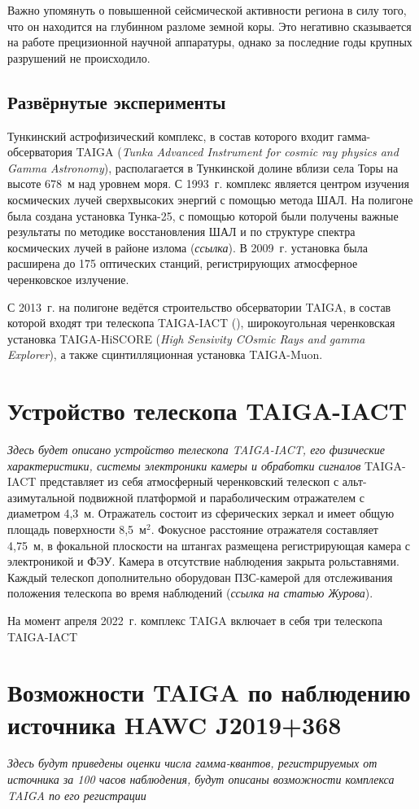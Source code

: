 \documentclass[magd,floatypics,numeref]{msudipl} %
\begin{document}
Важно упомянуть о повышенной сейсмической активности региона в силу того, что он находится на глубинном разломе земной коры. Это негативно сказывается на работе прецизионной научной аппаратуры, однако за последние годы крупных разрушений не происходило.
\subsection{Развёрнутые эксперименты}
Тункинский астрофизический комплекс, в состав которого входит гамма-обсерватория TAIGA (\textit{Tunka Advanced Instrument for cosmic ray physics and Gamma Astronomy}), располагается в Тункинской долине вблизи села Торы на высоте 678~м над уровнем моря. С 1993~г. комплекс является центром изучения космических лучей сверхвысоких энергий с помощью метода ШАЛ. На полигоне была создана установка Тунка-25, с помощью которой были получены важные результаты по методике восстановления ШАЛ и по структуре спектра космических лучей в районе излома (\textit{ссылка}). В 2009~г. установка была расширена до 175 оптических станций, регистрирующих атмосферное черенковское излучение. 

С 2013~г. на полигоне ведётся строительство обсерватории TAIGA, в состав которой входят три телескопа TAIGA-IACT (), широкоугольная черенковская установка TAIGA-HiSCORE (\textit{High Sensivity COsmic Rays and gamma Explorer}), а также сцинтилляционная установка TAIGA-Muon.
\section{Устройство телескопа TAIGA-IACT}
\textit{
Здесь будет описано устройство телескопа TAIGA-IACT, его физические характеристики, системы электроники камеры и обработки сигналов
}
TAIGA-IACT представляет из себя атмосферный черенковский телескоп с альт-азимутальной подвижной платформой и параболическим отражателем с диаметром 4,3~м. Отражатель состоит из сферических зеркал и имеет общую площадь поверхности 8,5~$\text{м}^\text{2}$. Фокусное расстояние отражателя составляет 4,75~м, в фокальной плоскости на штангах размещена регистрирующая камера с электроникой и ФЭУ. Камера в отсутствие наблюдения закрыта рольставнями. Каждый телескоп дополнительно оборудован ПЗС-камерой для отслеживания положения телескопа во время наблюдений (\textit{ссылка на статью Журова}). 

На момент апреля 2022~г. комплекс TAIGA включает в себя три телескопа TAIGA-IACT 
\section{Возможности TAIGA по наблюдению источника HAWC J2019+368}
\textit{
Здесь будут приведены оценки числа гамма-квантов, регистрируемых от источника за 100 часов наблюдения, будут описаны возможности комплекса TAIGA по его регистрации
}
\end{document}
